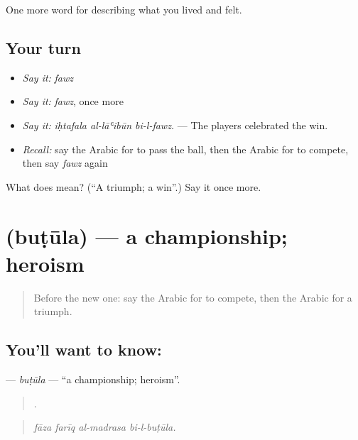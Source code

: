 \begin{grammarlens}[title={What you've built}]
One more word for describing what you lived and felt.
\end{grammarlens}

\subsection*{Your turn}
\begin{itemize}
\raggedright
  \item \emph{Say it:} \emph{fawz}
  \item \emph{Say it:} \emph{fawz}, once more
  \item \emph{Say it:} \emph{iḥtafala al-lāʿibūn bi-l-fawz.} — The players celebrated the win.
  \item \emph{Recall:} say the Arabic for to pass the ball, then the Arabic for to compete, then say \emph{fawz} again
\end{itemize}

\begin{tcolorbox}[breakable,colback=teal!4,colframe=teal!35!black,title={Before you move on}]
What does  mean? (\textquotedblleft{}A triumph; a win\textquotedblright{}.) Say it once more.
\end{tcolorbox}
\section[\texorpdfstring{\ar{بطولة} (buṭūla)}{بطولة (buṭūla)}]{ (buṭūla) — a championship; heroism}

\label{lesson:AR-C547-butula}



\begin{quote}
Before the new one: say the Arabic for to compete, then the Arabic for a triumph.
\end{quote}

\subsection*{You'll want to know: }
\textbf{} — \emph{buṭūla} — \textquotedblleft{}a championship; heroism\textquotedblright{}.

\begin{quote}
   .
\end{quote}

\begin{quote}
\emph{fāza farīq al-madrasa bi-l-buṭūla.}
\end{quote}


